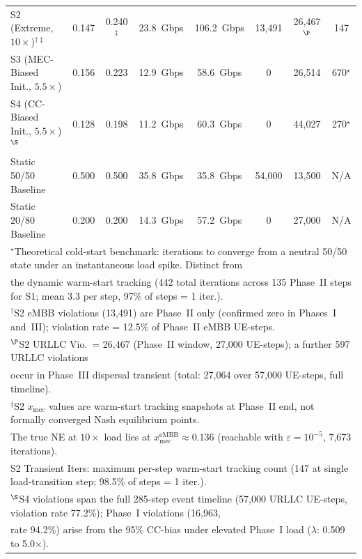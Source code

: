 \documentclass[conference]{IEEEtran}
\begin{document}
\begin{table}[t]
\begin{tabular}{lccccccc}
S2 (Extreme, $10\times$)$^{\dagger\ddagger}$
  & 0.147 & 0.240$^\ddagger$ & 23.8~Gbps & 106.2~Gbps & 13{,}491 & 26{,}467$^\P$ & 147 \\
S3 (MEC-Biased Init., $5.5\times$)
  & 0.156 & 0.223 & 12.9~Gbps & 58.6~Gbps & 0 & 26{,}514 & 670$^\star$ \\
S4 (CC-Biased Init., $5.5\times$)$^\S$
  & 0.128 & 0.198 & 11.2~Gbps & 60.3~Gbps & 0 & 44{,}027 & 270$^\star$ \\
\midrule
Static 50/50 Baseline
  & 0.500 & 0.500 & 35.8~Gbps & 35.8~Gbps & 54{,}000 & 13{,}500 & N/A \\
Static 20/80 Baseline
  & 0.200 & 0.200 & 14.3~Gbps & 57.2~Gbps & 0 & 27{,}000 & N/A \\
\bottomrule
\multicolumn{8}{l}{\footnotesize $^\star$Theoretical cold-start benchmark: iterations to converge from a neutral 50/50 state
  under an instantaneous load spike. Distinct from}\\
\multicolumn{8}{l}{\footnotesize \phantom{$^\star$}the dynamic warm-start tracking (442 total iterations across 135 Phase~II steps
  for S1; mean 3.3 per step, 97\% of steps = 1 iter.).}\\
\multicolumn{8}{l}{\footnotesize $^\dagger$S2 eMBB violations (13,491) are Phase~II only (confirmed zero in Phases~I and~III);
  violation rate = 12.5\% of Phase~II eMBB UE-steps.}\\
\multicolumn{8}{l}{\footnotesize $^\P$S2 URLLC Vio.\ = 26,467 (Phase~II window, 27,000 UE-steps); a further 597 URLLC violations}\\
\multicolumn{8}{l}{\footnotesize \phantom{$^\P$}occur in Phase~III dispersal transient (total: 27,064 over 57,000 UE-steps, full timeline).}\\
\multicolumn{8}{l}{\footnotesize $^\ddagger$S2 $x_\text{mec}$ values are warm-start tracking snapshots at Phase~II end, not formally
  converged Nash equilibrium points.}\\
\multicolumn{8}{l}{\footnotesize \phantom{$^\ddagger$}The true NE at $10\times$ load lies at $x_\text{mec}^\text{eMBB} \approx 0.136$
  (reachable with $\varepsilon = 10^{-5}$, 7,673 iterations).}\\
\multicolumn{8}{l}{\footnotesize \phantom{$^\dagger$}S2 Transient Iters: maximum per-step warm-start tracking count (147 at single
  load-transition step; 98.5\% of steps = 1 iter.).}\\
\multicolumn{8}{l}{\footnotesize $^\S$S4 violations span the full 285-step event timeline (57,000 URLLC UE-steps, violation rate
  77.2\%); Phase~I violations (16,963,}\\
\multicolumn{8}{l}{\footnotesize \phantom{$^\S$}rate 94.2\%) arise from the 95\% CC-bias under elevated Phase~I load
  ($\lambda$: 0.509 to 5.0$\times$).}\\
\end{tabular}
\end{table}
\end{document}
